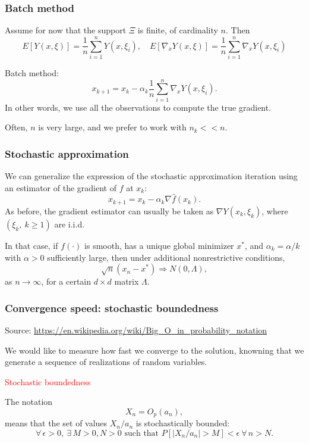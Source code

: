\documentclass{beamer}
\begin{document}
\begin{frame}
\frametitle{Batch method}

Assume for now that the support $\Xi$ is finite, of cardinality $n$. Then
$$
E[Y(x,\xi)] = \frac{1}{n} \sum_{i = 1}^n Y(x,\xi_i), \quad E[\nabla_x Y(x,\xi)] = \frac{1}{n} \sum_{i = 1}^n \nabla_x Y(x,\xi_i)
$$

\mbox{}

Batch method:
$$
x_{k+1} = x_k - \alpha_k \frac{1}{n} \sum_{i = 1}^{n} \nabla_x Y(x,\xi_i).
$$
In other words, we use all the observations to compute the true gradient.

\mbox{}

Often, $n$ is very large, and we prefer to work with $n_k << n$.

\end{frame}

\begin{frame}
\frametitle{Stochastic approximation}

We can generalize the expression of the stochastic approximation iteration using an estimator of the gradient of $f$ at $x_k$:
$$
x_{k+1} = x_k - \alpha_k\nabla\hat{f}(x_k).
$$
As before, the gradient estimator can usually be taken as $\nabla Y ( x_k, \xi_k )$,
where $(\xi_k,\ k \geq 1)$ are i.i.d.

\mbox{}

In that case, if $f(\cdot)$ is smooth, has a unique global minimizer $x^*$, and $\alpha_k = \alpha / k$ with $\alpha > 0$ sufficiently large, then under additional nonrestrictive conditions,
$$
\sqrt{n} \left(x_n - x^*\right) \Rightarrow N(0, \Lambda), 
$$
as $n \rightarrow \infty$, for a certain $d \times d$ matrix $\Lambda$.

\end{frame}

\begin{frame}
\frametitle{Convergence speed: stochastic boundedness}

Source: \url{https://en.wikipedia.org/wiki/Big_O_in_probability_notation}

\mbox{}

We would like to measure how fast we converge to the solution, knowning that we generate a sequence of realizations of random variables.

\mbox{}

\textcolor{red}{Stochastic boundedness}

The notation
$$
X_{n}=O_{p}(a_{n}),
$$
means that the set of values $X_n/a_n$ is stochastically bounded:
$$
\forall\, \epsilon > 0,\ \exists\, M > 0, N > 0 \text{ such that } P[|X_{n}/a_{n}|>M ] < \epsilon \ \forall\, n > N.
$$

\end{frame}
\end{document}
